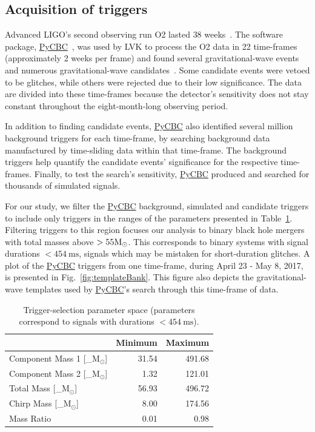 \documentclass[%
 nofootinbib,
 amsmath,amssymb,
 aps,
 twocolumn,
 superscriptaddress
]{revtex4-2}
\newcommand{\pycbc}{{\sc \href{https://pycbc.org/}{{PyCBC}}}\xspace}
\newcommand{\mathcmd}[1]{{\sc \relax\ifmmode#1\else $#1$\fi}\xspace}
\newcommand{\msun}{\mathcmd{\text{M}_\odot}}
\newcommand{\avi}[1]{\textcolor{orange}{[AV: #1]}}
\begin{document}
\subsection{Acquisition of triggers}
Advanced LIGO's second observing run O2 lasted $38$ weeks~\cite{GWOSC}. The software package, \pycbc~\cite{pycbc_code}, was used by LVK to process the O2 data in 22 time-frames (approximately 2 weeks per frame) and found several gravitational-wave events and numerous gravitational-wave candidates~\cite{pycbc_og0, pycbc_og1, pycbc_og2, pycbc_og3, pycbc_og4, pycbc_og5, pycbc_og6}. Some candidate events were vetoed to be glitches, while others were rejected due to their low significance. The data are divided into these time-frames because the detector's sensitivity does not stay constant throughout the eight-month-long observing period.

In addition to finding candidate events, \pycbc also identified several million background triggers for each time-frame, by searching background data manufactured by time-sliding data within that time-frame. The background triggers help quantify the candidate events' significance for the respective time-frames. Finally, to test the search's sensitivity, \pycbc produced and searched for thousands of simulated signals. 

For our study, we filter the \pycbc background, simulated and candidate triggers to include only triggers in the ranges of the parameters presented in Table~\ref{tab:parameters}. Filtering triggers to this region focuses our analysis to binary black hole mergers with total masses above $> 55 \msun$. This corresponds to binary systems with signal durations $<454 \ \text{ms}$, signals which may be mistaken for short-duration glitches. A plot of the \pycbc triggers from one time-frame, during April 23 - May 8, 2017, is presented in Fig.~\ref{fig:templateBank}. This figure also depicts the gravitational-wave templates used by \pycbc's search through this time-frame of data. 

\begin{table}[t]

\caption[BBH parameters correspond to duration $<454\ \text{ms}$]{\label{tab:parameters}Trigger-selection parameter space (parameters correspond to signals with durations $<454 \ \text{ms}$). }
\centering
\begin{tabular}{lrr}
\toprule
  & Minimum & Maximum\\
\midrule
Component Mass 1 [\msun] & 31.54 & 491.68\\
Component Mass 2 [\msun] & 1.32 & 121.01\\
Total Mass [\msun] & 56.93 & 496.72\\
Chirp Mass [\msun] & 8.00 & 174.56\\
Mass Ratio & 0.01 & 0.98\\
\end{tabular}
\end{table}
\end{document}
